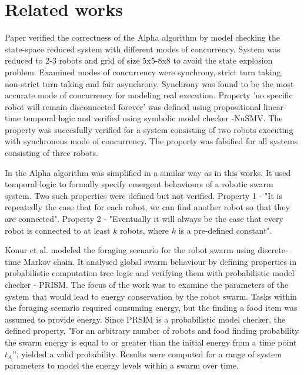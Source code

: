 \section{Related works}

Paper  \cite{Towards_Temporal_Verification_of_Emergent_Behaviours_in_Swarm_Robotic_Systems} verified the correctness of the Alpha algorithm by model checking the state-space reduced system with different modes of concurrency. System was reduced to 2-3 robots and grid of size 5x5-8x8 to avoid the state explosion problem. Examined modes of concurrency were synchrony, strict turn taking, non-strict turn taking and fair asynchrony. Synchrony was found to be the most accurate mode of concurrency for modeling real execution. Property 'no specific robot will remain disconnected forever' was defined using propositional linear-time temporal logic and verified using symbolic model checker -NuSMV. The property was succesfully verified for a system consisting of two robots executing with synchronous mode of concurrency. The property was falsified for all systems consisting of three robots.

In \cite{On_Formal_Specification_of_Emergent_Behaviours_in_Swarm_Robotic_Systems} the Alpha algorithm was simplified in a similar way as in this works. It used temporal logic to formally specify emergent behaviours of a robotic swarm system. Two such properties were defined but not verified. Property 1 - "It is repeatedly the case that for each robot, we can find another robot so that they are connected". Property 2 - "Eventually it will always be the case that every robot is connected to at least $k$ robots, where $k$ is a pre-defined constant".

Konur et al. \cite{Formal_Verification_of_Probabilistic_Swarm_Behaviours} modeled the foraging scenario for the robot swarm using discrete-time Markov chain. It analysed global swarm behaviour by defining properties in probabilistic computation tree logic and verifying them with probabilistic model checker - PRISM. The focus of the work was to examine the parameters of the system that would lead to energy conservation by the robot swarm. Tasks within the foraging scenario required consuming energy, but the finding a food item was assumed to provide energy. Since PRSIM is a probabilistic model checker, the defined property, "For an arbitrary number of robots and food finding probability the swarm energy is equal to or greater than the initial energy from a time point $t_A$”, yielded a valid probability. Results were computed for a range of system parameters to model the energy levels within a swarm over time.  
